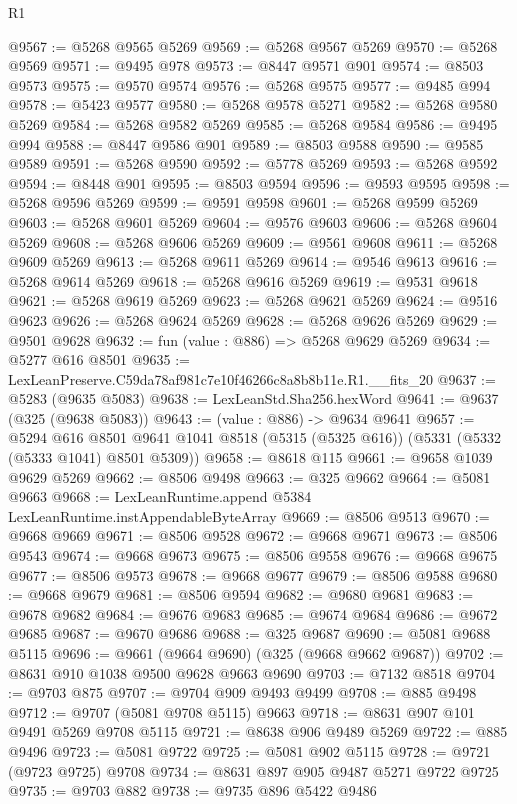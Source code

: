 \begin{lexlean}{R1}
\begin{coremodule}
@9567 := @5268 @9565 @5269
@9569 := @5268 @9567 @5269
@9570 := @5268 @9569
@9571 := @9495 @978
@9573 := @8447 @9571 @901
@9574 := @8503 @9573
@9575 := @9570 @9574
@9576 := @5268 @9575
@9577 := @9485 @994
@9578 := @5423 @9577
@9580 := @5268 @9578 @5271
@9582 := @5268 @9580 @5269
@9584 := @5268 @9582 @5269
@9585 := @5268 @9584
@9586 := @9495 @994
@9588 := @8447 @9586 @901
@9589 := @8503 @9588
@9590 := @9585 @9589
@9591 := @5268 @9590
@9592 := @5778 @5269
@9593 := @5268 @9592
@9594 := @8448 @901
@9595 := @8503 @9594
@9596 := @9593 @9595
@9598 := @5268 @9596 @5269
@9599 := @9591 @9598
@9601 := @5268 @9599 @5269
@9603 := @5268 @9601 @5269
@9604 := @9576 @9603
@9606 := @5268 @9604 @5269
@9608 := @5268 @9606 @5269
@9609 := @9561 @9608
@9611 := @5268 @9609 @5269
@9613 := @5268 @9611 @5269
@9614 := @9546 @9613
@9616 := @5268 @9614 @5269
@9618 := @5268 @9616 @5269
@9619 := @9531 @9618
@9621 := @5268 @9619 @5269
@9623 := @5268 @9621 @5269
@9624 := @9516 @9623
@9626 := @5268 @9624 @5269
@9628 := @5268 @9626 @5269
@9629 := @9501 @9628
@9632 := fun (value : @886) => @5268 @9629 @5269
@9634 := @5277 @616 @8501
@9635 := LexLeanPreserve.C59da78af981c7e10f46266c8a8b8b11e.R1.__fits_20
@9637 := @5283 (@9635 @5083)
@9638 := LexLeanStd.Sha256.hexWord
@9641 := @9637 (@325 (@9638 @5083))
@9643 := (value : @886) -> @9634 @9641
@9657 := @5294
    @616
    @8501
    @9641
    @1041
    @8518
    (@5315 (@5325 @616))
    (@5331 (@5332 (@5333 @1041) @8501 @5309))
@9658 := @8618 @115
@9661 := @9658 @1039 @9629 @5269
@9662 := @8506 @9498
@9663 := @325 @9662
@9664 := @5081 @9663
@9668 := LexLeanRuntime.append @5384 LexLeanRuntime.instAppendableByteArray
@9669 := @8506 @9513
@9670 := @9668 @9669
@9671 := @8506 @9528
@9672 := @9668 @9671
@9673 := @8506 @9543
@9674 := @9668 @9673
@9675 := @8506 @9558
@9676 := @9668 @9675
@9677 := @8506 @9573
@9678 := @9668 @9677
@9679 := @8506 @9588
@9680 := @9668 @9679
@9681 := @8506 @9594
@9682 := @9680 @9681
@9683 := @9678 @9682
@9684 := @9676 @9683
@9685 := @9674 @9684
@9686 := @9672 @9685
@9687 := @9670 @9686
@9688 := @325 @9687
@9690 := @5081 @9688 @5115
@9696 := @9661 (@9664 @9690) (@325 (@9668 @9662 @9687))
@9702 := @8631 @910 @1038 @9500 @9628 @9663 @9690
@9703 := @7132 @8518
@9704 := @9703 @875
@9707 := @9704 @909 @9493 @9499
@9708 := @885 @9498
@9712 := @9707 (@5081 @9708 @5115) @9663
@9718 := @8631 @907 @101 @9491 @5269 @9708 @5115
@9721 := @8638 @906 @9489 @5269
@9722 := @885 @9496
@9723 := @5081 @9722
@9725 := @5081 @902 @5115
@9728 := @9721 (@9723 @9725) @9708
@9734 := @8631 @897 @905 @9487 @5271 @9722 @9725
@9735 := @9703 @882
@9738 := @9735 @896 @5422 @9486

\end{coremodule}
\end{lexlean}
